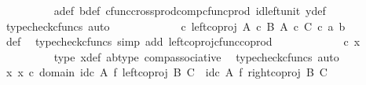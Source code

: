 \begin{isabellebody}
\ \ \ \ \ \ \ \ \isamarkupfalse%
\ a{\isacharunderscore}{\kern0pt}def\ b{\isacharunderscore}{\kern0pt}def\ cfunc{\isacharunderscore}{\kern0pt}cross{\isacharunderscore}{\kern0pt}prod{\isacharunderscore}{\kern0pt}comp{\isacharunderscore}{\kern0pt}cfunc{\isacharunderscore}{\kern0pt}prod\ id{\isacharunderscore}{\kern0pt}left{\isacharunderscore}{\kern0pt}unit{}\ y{\isacharunderscore}{\kern0pt}def{}\ \isamarkupfalse%
\ {\isacharparenleft}{\kern0pt}typecheck{\isacharunderscore}{\kern0pt}cfuncs{\isacharcomma}{\kern0pt}\ auto{\isacharparenright}{\kern0pt}\isanewline
\ \ \ \ \ \ \isamarkupfalse%
\ \isamarkupfalse%
\ {\isachardoublequoteopen}{\isachardot}{\kern0pt}{\isachardot}{\kern0pt}{\isachardot}{\kern0pt}\ {\isacharequal}{\kern0pt}\ {\isacharparenleft}{\kern0pt}{\isasymphi}\ {\isasymcirc}\isactrlsub c\ left{\isacharunderscore}{\kern0pt}coproj\ {\isacharparenleft}{\kern0pt}A\ {\isasymtimes}\isactrlsub c\ B{\isacharparenright}{\kern0pt}\ {\isacharparenleft}{\kern0pt}A\ {\isasymtimes}\isactrlsub c\ C{\isacharparenright}{\kern0pt}{\isacharparenright}{\kern0pt}\ {\isasymcirc}\isactrlsub c\ {\isasymlangle}a{\isacharcomma}{\kern0pt}\ b{\isasymrangle}{\isachardoublequoteclose}\isanewline
\ \ \ \ \ \ \ \ \isamarkupfalse%
\ {\isasymphi}{\isacharunderscore}{\kern0pt}def\ \isamarkupfalse%
\ {\isacharparenleft}{\kern0pt}typecheck{\isacharunderscore}{\kern0pt}cfuncs{\isacharcomma}{\kern0pt}\ simp\ add{\isacharcolon}{\kern0pt}\ left{\isacharunderscore}{\kern0pt}coproj{\isacharunderscore}{\kern0pt}cfunc{\isacharunderscore}{\kern0pt}coprod{\isacharparenright}{\kern0pt}\isanewline
\ \ \ \ \ \ \isamarkupfalse%
\ \isamarkupfalse%
\ {\isachardoublequoteopen}{\isachardot}{\kern0pt}{\isachardot}{\kern0pt}{\isachardot}{\kern0pt}\ {\isacharequal}{\kern0pt}\ {\isasymphi}\ {\isasymcirc}\isactrlsub c\ x{\isachardoublequoteclose}\isanewline
\ \ \ \ \ \ \ \ \isamarkupfalse%
\ {\isasymphi}{\isacharunderscore}{\kern0pt}type\ x{\isacharunderscore}{\kern0pt}def\ ab{\isacharunderscore}{\kern0pt}type\ comp{\isacharunderscore}{\kern0pt}associative{}\ \isamarkupfalse%
\ {\isacharparenleft}{\kern0pt}typecheck{\isacharunderscore}{\kern0pt}cfuncs{\isacharcomma}{\kern0pt}\ auto{\isacharparenright}{\kern0pt}\isanewline
\ \ \ \ \ \ \isamarkupfalse%
\ \isamarkupfalse%
\ {\isachardoublequoteopen}{\isasymexists}x{\isachardot}{\kern0pt}\ x\ {\isasymin}\isactrlsub c\ domain\ {\isacharparenleft}{\kern0pt}{\isacharparenleft}{\kern0pt}id\isactrlsub c\ A\ {\isasymtimes}\isactrlsub f\ left{\isacharunderscore}{\kern0pt}coproj\ B\ C{\isacharparenright}{\kern0pt}\ {\isasymamalg}\ {\isacharparenleft}{\kern0pt}id\isactrlsub c\ A\ {\isasymtimes}\isactrlsub f\ right{\isacharunderscore}{\kern0pt}coproj\ B\ C{\isacharparenright}{\kern0pt}{\isacharparenright}{\kern0pt}\ {\isasymand}\isanewline

\end{isabellebody}
